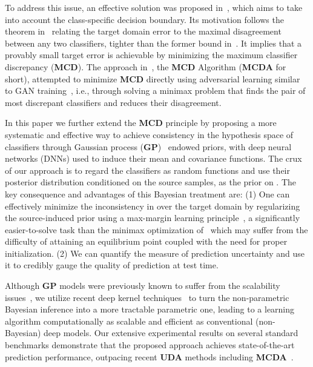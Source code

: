 \documentclass[10pt,letterpaper]{article}
\begin{document}
To address this issue, an effective solution was proposed in~\cite{saito2018}, which aims to take into account the class-specific decision boundary. Its motivation follows the theorem in~\cite{ben-david-2010} relating the target domain error to the maximal disagreement between any two classifiers, tighter than the former bound in~\cite{ben-david-2007}. It implies that a provably small target error is achievable by minimizing the maximum classifier discrepancy (\textbf{MCD}). The approach in~\cite{saito2018}, the \textbf{MCD} Algorithm (\textbf{MCDA} for short), attempted to minimize \textbf{MCD} directly using adversarial learning similar to GAN training~\cite{gan14}, i.e., through solving a minimax problem that finds the pair of most discrepant classifiers and reduces their disagreement.  

In this paper we further extend the \textbf{MCD} principle by proposing a more systematic and effective way to achieve consistency in the hypothesis space of classifiers  through Gaussian process (\textbf {GP})~\cite{gpml_book} endowed priors, with deep neural networks (DNNs) used to induce their mean and covariance functions. The crux of our approach is to regard the classifiers as random functions and use their posterior distribution conditioned on the source samples, as the prior on .  The key consequence and advantages of this Bayesian treatment are: (1) One can effectively minimize the inconsistency in  over the target domain by regularizing the source-induced prior using a max-margin learning principle~\cite{wang2013max}, a significantly easier-to-solve task than the minimax optimization of~\cite{saito2018} which may suffer from the difficulty of attaining an equilibrium point coupled with the need for proper initialization. 
(2) We can quantify the measure of prediction uncertainty and use it to credibly gauge the quality of prediction at test time.
 
Although \textbf {GP} models were previously known to suffer from the scalability issues~\cite{gpml_book}, we utilize recent deep kernel techniques~\cite{deep_kernel,dkl16} to turn the non-parametric Bayesian inference into a more tractable parametric one, leading to a learning algorithm computationally as scalable and efficient as conventional (non-Bayesian) deep models.
Our extensive experimental results on several standard benchmarks demonstrate that the proposed approach achieves state-of-the-art prediction performance, outpacing recent \textbf{UDA} methods including \textbf{MCDA}~\cite{saito2018}. 
\end{document}
